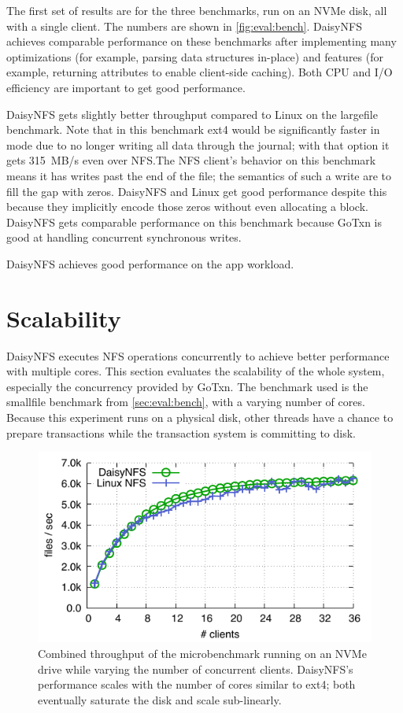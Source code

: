 The first set of results are for the three benchmarks, run on an NVMe disk, all
with a single client. The numbers are shown in \cref{fig:eval:bench}. DaisyNFS achieves
comparable performance on these benchmarks after implementing many optimizations
(for example, parsing data structures in-place) and features (for example,
returning attributes to enable client-side caching). Both CPU and I/O efficiency
are important to get good performance.

DaisyNFS gets slightly better throughput compared to Linux on the largefile
benchmark. Note that in this benchmark ext4 would be significantly faster in
 mode due to no longer writing all data through the journal;
with that option it gets 315~MB/s even over NFS.\@ The NFS client's behavior on
this benchmark means it has writes past the end of the file; the semantics of
such a write are to fill the gap with zeros. DaisyNFS and Linux get good
performance despite this because they implicitly encode those zeros without even
allocating a block. DaisyNFS gets comparable performance on this benchmark
because GoTxn is good at handling concurrent synchronous writes.

DaisyNFS achieves good performance on the app workload.

\section{Scalability}
\label{sec:eval:scale}

DaisyNFS executes NFS operations concurrently to achieve better performance with
multiple cores. This section evaluates the scalability of the whole system,
especially the concurrency provided by GoTxn. The benchmark used is the smallfile benchmark from
\cref{sec:eval:bench}, with a varying number of cores. Because this experiment runs
on a physical disk, other threads have a chance to prepare transactions while the
transaction system is committing to disk.

\begin{figure}
  \includegraphics{daisy-nfs/fig/scale.pdf}
  \caption[Concurrent smallfile performance]%
{Combined throughput of the  microbenchmark running on
    an NVMe drive while
    varying the number of concurrent clients. DaisyNFS's performance scales with the
    number of cores similar to ext4; both eventually saturate the disk and scale
    sub-linearly.}
  \label{fig:eval:scale}
\end{figure}

